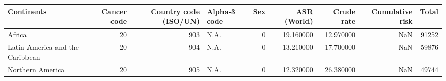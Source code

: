 \begin{tabular}{lrrlrrrrr}
\toprule
Continents & Cancer code & Country code (ISO/UN) & Alpha‑3 code & Sex & ASR (World) & Crude rate & Cumulative risk & Total \\
\midrule
Africa & 20 & 903 & N.A. & 0 & 19.160000 & 12.970000 & NaN & 91252 \\
Latin America and the Caribbean & 20 & 904 & N.A. & 0 & 13.210000 & 17.700000 & NaN & 59876 \\
Northern America & 20 & 905 & N.A. & 0 & 12.320000 & 26.380000 & NaN & 49744 \\
\bottomrule
\end{tabular}
